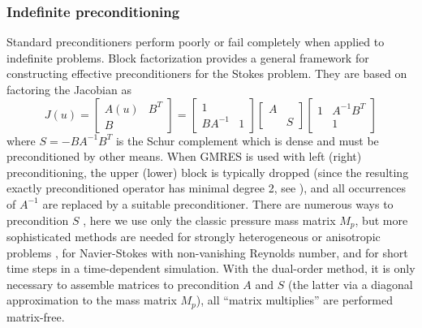 \subsubsection{Indefinite preconditioning}
Standard preconditioners perform poorly or fail completely when applied to indefinite problems.  Block factorization
provides a general framework for constructing effective preconditioners for the Stokes problem.  They are based on
factoring the Jacobian as
\begin{equation}\label{eq:schur}
  J(u) = \begin{bmatrix} A(u) & B^T \\ B & \end{bmatrix} =
  \begin{bmatrix} 1 & \\ BA^{-1} & 1 \end{bmatrix}
  \begin{bmatrix} A & \\ & S \end{bmatrix}
  \begin{bmatrix} 1 & A^{-1}B^T \\ & 1 \end{bmatrix}
\end{equation}
where $S = -BA^{-1}B^T$ is the Schur complement which is dense and must be preconditioned by other means.  When GMRES is
used with left (right) preconditioning, the upper (lower) block is typically dropped (since the resulting exactly
preconditioned operator has minimal degree 2, see \citet{murphy2000npi}), and all occurrences of $A^{-1}$ are replaced by
a suitable preconditioner.  There are numerous ways to precondition $S$ \citep[\eg][]{benzi2005nss,elman2008tcp}, here we
use only the classic pressure mass matrix $M_p$, but more sophisticated methods are needed for strongly heterogeneous or
anisotropic problems \citep[see][]{may2008pim}, for Navier-Stokes with non-vanishing Reynolds number, and for short time
steps in a time-dependent simulation.  With the dual-order method, it is only necessary to assemble matrices to
precondition $A$ and $S$ (the latter via a diagonal approximation to the mass matrix $M_p$), all ``matrix multiplies''
are performed matrix-free.

